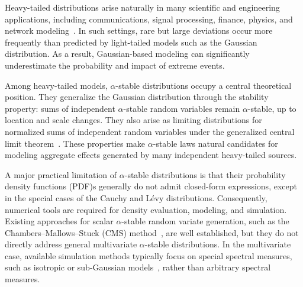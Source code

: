 Heavy-tailed distributions arise naturally in many scientific and engineering applications, including communications, signal processing, finance, physics, and network modeling~\cite{marcel2008,Tsih1995,crovella1998heavy,nolancirc2013,taleb2022statisticalconsequencesfattails}. In such settings, rare but large deviations occur more frequently than predicted by light-tailed models such as the Gaussian distribution. As a result, Gaussian-based modeling can significantly underestimate the probability and impact of extreme events.

Among heavy-tailed models, $\alpha$-stable distributions occupy a central theoretical position. They generalize the Gaussian distribution through the stability property: sums of independent $\alpha$-stable random variables remain $\alpha$-stable, up to location and scale changes. They also arise as limiting distributions for normalized sums of independent random variables under the generalized central limit theorem~\cite{kolmo1968}. These properties make $\alpha$-stable laws natural candidates for modeling aggregate effects generated by many independent heavy-tailed sources.

A major practical limitation of $\alpha$-stable distributions is that their probability density functions (PDF)s generally do not admit closed-form expressions, except in the special cases of the Cauchy and Lévy distributions. Consequently, numerical tools are required for density evaluation, modeling, and simulation. Existing approaches for scalar $\alpha$-stable random variate generation, such as the Chambers--Mallows--Stuck (CMS) method~\cite{ChambersJ.M.1976AMfS}, are well established, but they do not directly address general multivariate $\alpha$-stable distributions. In the multivariate case, available simulation methods typically focus on special spectral measures, such as isotropic or sub-Gaussian models~\cite{nolancirc2013}, rather than arbitrary spectral measures.

